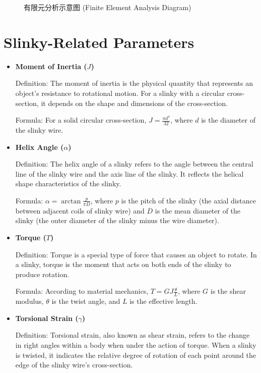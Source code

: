 \documentclass{mcmthesis}  %
\begin{document}
\begin{appendices}
\begin{figure}[h!]
    \centering
    \caption{有限元分析示意图 (Finite Element Analysis Diagram)}
    \label{fig:finite_element_analysis}
\end{figure}

\section{Slinky-Related Parameters}  %

\begin{itemize}
    \item \textbf{Moment of Inertia ($J$)}
    
    Definition: The moment of inertia is the physical quantity that represents an object's resistance to rotational motion. For a slinky with a circular cross-section, it depends on the shape and dimensions of the cross-section.
    
    Formula: For a solid circular cross-section, $J = \frac{\pi d^4}{32}$, where $d$ is the diameter of the slinky wire.

    \item \textbf{Helix Angle ($\alpha$)}
    
    Definition: The helix angle of a slinky refers to the angle between the central line of the slinky wire and the axis line of the slinky. It reflects the helical shape characteristics of the slinky.
    
    Formula: $\alpha = \arctan \frac{p}{\pi D}$, where $p$ is the pitch of the slinky (the axial distance between adjacent coils of slinky wire) and $D$ is the mean diameter of the slinky (the outer diameter of the slinky minus the wire diameter).

    \item \textbf{Torque ($T$)}
    
    Definition: Torque is a special type of force that causes an object to rotate. In a slinky, torque is the moment that acts on both ends of the slinky to produce rotation.
    
    Formula: According to material mechanics, $T = GJ\frac{\theta}{L}$, where $G$ is the shear modulus, $\theta$ is the twist angle, and $L$ is the effective length.

    \item \textbf{Torsional Strain ($\gamma$)}
    
    Definition: Torsional strain, also known as shear strain, refers to the change in right angles within a body when under the action of torque. When a slinky is twisted, it indicates the relative degree of rotation of each point around the edge of the slinky wire's cross-section.
    

\end{itemize}
\end{appendices}
\end{document}
